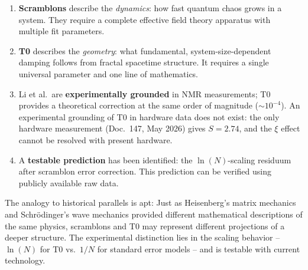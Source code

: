 \begin{enumerate}
	\item \textbf{Scramblons} describe the \emph{dynamics}: how fast quantum chaos grows in a system. They require a complete effective field theory apparatus with multiple fit parameters.
	
	\item \textbf{T0} describes the \emph{geometry}: what fundamental, system-size-dependent damping follows from fractal spacetime structure. It requires a single universal parameter and one line of mathematics.
	
	\item Li et al.\ are \textbf{experimentally grounded} in NMR measurements; T0 provides a theoretical correction at the same order of magnitude ($\sim 10^{-4}$). An experimental grounding of T0 in hardware data does not exist: the only hardware measurement (Doc.~147, May 2026) gives $S = 2.74$, and the $\xi$ effect cannot be resolved with present hardware.
	
	\item A \textbf{testable prediction} has been identified: the $\ln(N)$-scaling residuum after scramblon error correction. This prediction can be verified using publicly available raw data.
\end{enumerate}

The analogy to historical parallels is apt: Just as Heisenberg's matrix mechanics and Schrödinger's wave mechanics provided different mathematical descriptions of the same physics, scramblons and T0 may represent different projections of a deeper structure. The experimental distinction lies in the scaling behavior -- $\ln(N)$ for T0 vs.\ $1/N$ for standard error models -- and is testable with current technology.


